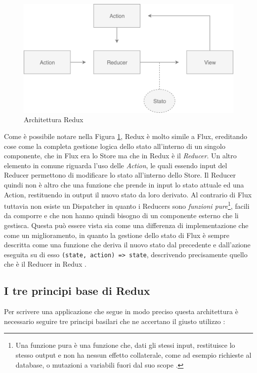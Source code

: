 \begin{figure}[h]
\centering
\vspace*{0.5cm} 
\includegraphics[width=11.5cm]{./images/ReduxWorkflow}
\caption{Architettura Redux}
\label{ReduxWorkflow}
\vspace*{0.5cm} 
\end{figure}

Come è possibile notare nella Figura \ref{ReduxWorkflow}, Redux è molto simile a Flux, ereditando cose come la completa gestione logica dello stato all'interno di un singolo componente, che in Flux era lo Store ma che in Redux è il \textit{Reducer}. Un altro elemento in comune riguarda l'uso delle \textit{Action}, le quali essendo input del Reducer permettono di modificare lo stato all'interno dello Store. Il Reducer quindi non è altro che una funzione che prende in input lo stato attuale ed una Action, restituendo in output il nuovo stato da loro derivato.
Al contrario di Flux tuttavia non esiste un Dispatcher in quanto i Reducers sono \textit{funzioni pure}\footnote{Una funzione pura è una funzione che, dati gli stessi input, restituisce lo stesso output e non ha nessun effetto collaterale, come ad esempio richieste al database, o mutazioni a variabili fuori dal suo scope \cite{FranklinOnPureFunctions}.}, facili da comporre e che non hanno quindi bisogno di un componente esterno che li gestisca. Questa può essere vista sia come una differenza di implementazione che come un miglioramento, in quanto la gestione dello stato di Flux è sempre descritta come una funzione che deriva il nuovo stato dal precedente e dall'azione eseguita su di esso \texttt{(state, action) => state}, descrivendo precisamente quello che è il Reducer in Redux \cite{ReduxDocumentation}.

\subsection{I tre principi base di Redux}
Per scrivere una applicazione che segue in modo preciso questa architettura è necessario seguire tre principi basilari che ne accertano il giusto utilizzo \cite{ReduxDocumentation}:

